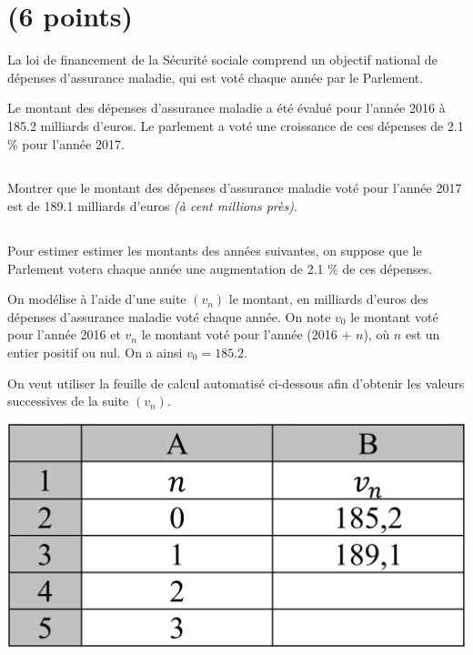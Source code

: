 \section{(6 points)}

La loi de financement de la Sécurité sociale comprend un objectif national de dépenses d'assurance maladie, qui est voté chaque année par le Parlement.

Le montant des dépenses d'assurance maladie a été évalué pour l'année 2016 à \num{185.2} milliards d'euros. Le parlement a voté une croissance de ces dépenses de \num{2.1} \% pour l'année 2017.

\subsection{}

\begin{questions}
	\question Montrer que le montant des dépenses  d'assurance maladie voté pour l'année 2017 est de \num{189.1} milliards d'euros \emph{(à cent millions près)}.
	
	
	
\end{questions}

\subsection{}

Pour estimer estimer les montants des années suivantes, on suppose que le Parlement votera chaque année une augmentation de \num{2.1} \% de ces dépenses.

On modélise à l'aide d'une suite $(v_n)$ le montant, en milliards d'euros des dépenses d'assurance maladie voté chaque année. On note $v_0$ le montant voté pour l'année 2016 et $v_n$ le montant voté pour l'année (2016 + $n$), où $n$ est un entier positif ou nul. On a ainsi $v_0 = \num{185.2}$.


 On veut utiliser la feuille de calcul automatisé ci-dessous afin d'obtenir les valeurs successives de la suite $(v_n)$.
 
 \begin{center}
 	\includegraphics[scale=0.2]{img/secu}
 \end{center}

